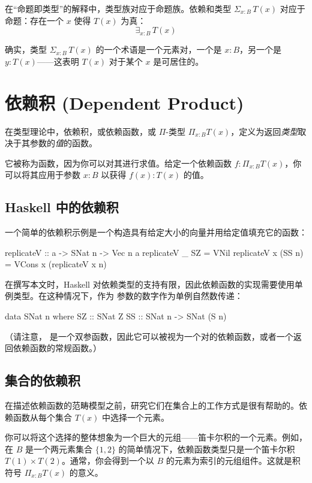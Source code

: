 \documentclass[DaoFP]{subfiles}
\begin{document}
  在“命题即类型”的解释中，类型族对应于命题族。依赖和类型 $\Sigma_{x : B} \, T(x)$ 对应于命题：存在一个 $x$ 使得 $T(x)$ 为真：
  \[ \exists_{x : B} \, T (x)\]

  确实，类型 $\Sigma_{x : B} \, T(x)$ 的一个术语是一个元素对，一个是 $x \colon B$，另一个是 $y \colon T(x)$——这表明 $T(x)$ 对于某个 $x$ 是可居住的。

  \section{依赖积 (Dependent Product)}

  在类型理论中，依赖积，或依赖函数，或 $\Pi$-类型 $\Pi_{x:B} T(x)$，定义为返回\emph{类型}取决于其参数的\emph{值}的函数。

  它被称为函数，因为你可以对其进行求值。给定一个依赖函数 $f \colon \Pi_{x:B} T(x)$，你可以将其应用于参数 $x\colon B$ 以获得 $f(x) \colon T(x)$ 的值。

  \subsection{Haskell 中的依赖积}
  一个简单的依赖积示例是一个构造具有给定大小的向量并用给定值填充它的函数：
  \begin{haskell}
   replicateV :: a -> SNat n -> Vec n a
   replicateV _ SZ  = VNil
   replicateV x (SS n) = VCons x (replicateV x n)
  \end{haskell}

  在撰写本文时，Haskell 对依赖类型的支持有限，因此依赖函数的实现需要使用单例类型。在这种情况下，作为  参数的数字作为单例自然数传递：
  \begin{haskell}
   data SNat n where
   SZ :: SNat Z
   SS :: SNat n -> SNat (S n)
  \end{haskell}
  （请注意， 是一个双参函数，因此它可以被视为一个对的依赖函数，或者一个返回依赖函数的常规函数。）
  \subsection{集合的依赖积}
  在描述依赖函数的范畴模型之前，研究它们在集合上的工作方式是很有帮助的。依赖函数从每个集合 $T(x)$ 中选择一个元素。

  你可以将这个选择的整体想象为一个巨大的元组——笛卡尔积的一个元素。例如，在 $B$ 是一个两元素集合 $\{1, 2\}$ 的简单情况下，依赖函数类型只是一个笛卡尔积 $T(1) \times T(2)$。通常，你会得到一个以 $B$ 的元素为索引的元组组件。这就是积符号 $\Pi_{x:B} T(x)$ 的意义。
\end{document}
